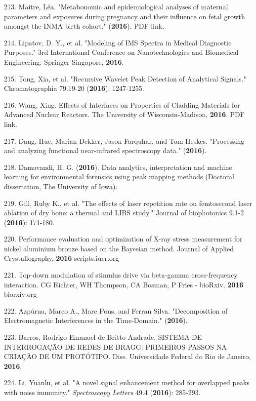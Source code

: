 213. Maitre, L\'{e}a. "Metabonomic and epidemiological analyses of maternal parameters and exposures during pregnancy and their influence on fetal growth amongst the INMA birth cohort." (\textbf{2016}). PDF link.

214. Lipatov, D. Y., et al. "Modeling of IMS Spectra in Medical Diagnostic Purposes." 3rd International Conference on Nanotechnologies and Biomedical Engineering. Springer Singapore, \textbf{2016}.

215. Tong, Xia, et al. "Recursive Wavelet Peak Detection of Analytical Signals." Chromatographia 79.19-20 (\textbf{2016}): 1247-1255.

216. Wang, Xing. Effects of Interfaces on Properties of Cladding Materials for Advanced Nuclear Reactors. The University of Wisconsin-Madison, \textbf{2016}. PDF link.

217. Dang, Hue, Marian Dekker, Jason Farquhar, and Tom Heskes. "Processing and analyzing functional near-infrared spectroscopy data." (\textbf{2016}).

218. Damavandi, H. G. (\textbf{2016}). Data analytics, interpretation and machine learning for environmental forensics using peak mapping methods (Doctoral dissertation, The University of Iowa).

219. Gill, Ruby K., et al. "The effects of laser repetition rate on femtosecond laser ablation of dry bone: a thermal and LIBS study." Journal of biophotonics 9.1-2 (\textbf{2016}): 171-180.

220. Performance evaluation and optimization of X-ray stress measurement for nickel aluminium bronze based on the Bayesian method. Journal of Applied Crystallography, \textbf{2016} \textendash{} scripts.iucr.org

221. Top-down modulation of stimulus drive via beta-gamma cross-frequency interaction. CG Richter, WH Thompson, CA Bosman, P Fries - bioRxiv, \textbf{2016} \textendash{} biorxiv.org

222. Azp\'{u}rua, Marco A., Marc Pous, and Ferran Silva. "Decomposition of Electromagnetic Interferences in the Time-Domain." (\textbf{2016}).

223. Barros, Rodrigo Emanoel de Britto Andrade. SISTEMA DE INTERROGA\c{C}\~{A}O DE REDES DE BRAGG: PRIMEIROS PASSOS NA CRIA\c{C}\~{A}O DE UM PROT\'{O}TIPO. Diss. Universidade Federal do Rio de Janeiro, \textbf{2016}.

224. Li, Yuanlu, et al. "A novel signal enhancement method for overlapped peaks with noise immunity." \textit{Spectroscopy Letters} 49.4 (\textbf{2016}): 285-293.

